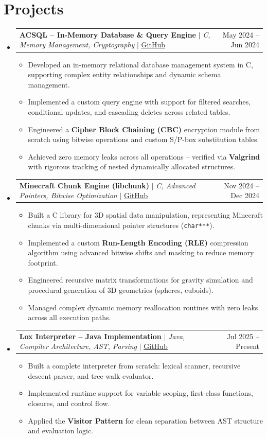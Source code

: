 \documentclass[letterpaper,11pt]{article}
\makeatletter
\newcommand{\resumeItem}[1]{
  \item\small{
    {#1 \vspace{-2pt}}
  }
}
\newcommand{\resumeProjectHeading}[2]{
    \item
    \begin{tabular*}{0.97\textwidth}{l@{\extracolsep{\fill}}r}
      \small#1 & \small #2 \\
    \end{tabular*}\vspace{-7pt}
}
\newcommand{\resumeSubHeadingListStart}{\begin{itemize}[leftmargin=0.15in, label={}]}
\newcommand{\resumeSubHeadingListEnd}{\end{itemize}}
\newcommand{\resumeItemListStart}{\begin{itemize}}
\newcommand{\resumeItemListEnd}{\end{itemize}\vspace{-5pt}}
\makeatother
\begin{document}
\section{Projects}
    \resumeSubHeadingListStart
      \resumeProjectHeading
          {\textbf{ACSQL -- In-Memory Database \& Query Engine} $|$ \emph{C, Memory Management, Cryptography} $|$ \href{https://github.com/RaduAndreiTudorica}{\underline{GitHub}}}{May 2024 -- Jun 2024}
          \resumeItemListStart
            \resumeItem{Developed an in-memory relational database management system in C, supporting complex entity relationships and dynamic schema management.}
            \resumeItem{Implemented a custom query engine with support for filtered searches, conditional updates, and cascading deletes across related tables.}
            \resumeItem{Engineered a \textbf{Cipher Block Chaining (CBC)} encryption module from scratch using bitwise operations and custom S/P-box substitution tables.}
            \resumeItem{Achieved zero memory leaks across all operations -- verified via \textbf{Valgrind} with rigorous tracking of nested dynamically allocated structures.}
          \resumeItemListEnd

      \resumeProjectHeading
          {\textbf{Minecraft Chunk Engine (libchunk)} $|$ \emph{C, Advanced Pointers, Bitwise Optimization} $|$ \href{https://github.com/RaduAndreiTudorica}{\underline{GitHub}}}{Nov 2024 -- Dec 2024}
          \resumeItemListStart
            \resumeItem{Built a C library for 3D spatial data manipulation, representing Minecraft chunks via multi-dimensional pointer structures (\texttt{char***}).}
            \resumeItem{Implemented a custom \textbf{Run-Length Encoding (RLE)} compression algorithm using advanced bitwise shifts and masking to reduce memory footprint.}
            \resumeItem{Engineered recursive matrix transformations for gravity simulation and procedural generation of 3D geometries (spheres, cuboids).}
            \resumeItem{Managed complex dynamic memory reallocation routines with zero leaks across all execution paths.}
          \resumeItemListEnd

      \resumeProjectHeading
          {\textbf{Lox Interpreter -- Java Implementation} $|$ \emph{Java, Compiler Architecture, AST, Parsing} $|$ \href{https://github.com/RaduAndreiTudorica}{\underline{GitHub}}}{Jul 2025 -- Present}
          \resumeItemListStart
            \resumeItem{Built a complete interpreter from scratch: lexical scanner, recursive descent parser, and tree-walk evaluator.}
            \resumeItem{Implemented runtime support for variable scoping, first-class functions, closures, and control flow.}
            \resumeItem{Applied the \textbf{Visitor Pattern} for clean separation between AST structure and evaluation logic.}
          \resumeItemListEnd
    \resumeSubHeadingListEnd
\end{document}
